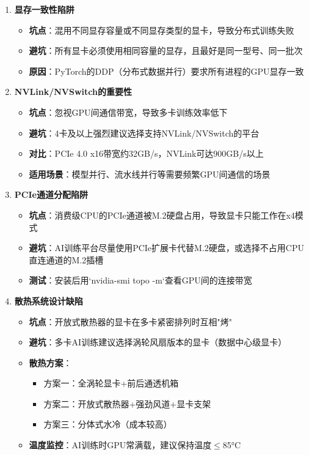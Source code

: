 \documentclass[12pt,UTF8]{ctexbook}
\begin{document}
\begin{enumerate}
    \item \textbf{显存一致性陷阱}
    \begin{itemize}[leftmargin=2em]
        \item \textbf{坑点}：混用不同显存容量或不同显存类型的显卡，导致分布式训练失败
        \item \textbf{避坑}：所有显卡必须使用相同容量的显存，且最好是同一型号、同一批次
        \item \textbf{原因}：PyTorch的DDP（分布式数据并行）要求所有进程的GPU显存一致
    \end{itemize}
    
    \item \textbf{NVLink/NVSwitch的重要性}
    \begin{itemize}[leftmargin=2em]
        \item \textbf{坑点}：忽视GPU间通信带宽，导致多卡训练效率低下
        \item \textbf{避坑}：4卡及以上强烈建议选择支持NVLink/NVSwitch的平台
        \item \textbf{对比}：PCIe 4.0 x16带宽约32GB/s，NVLink可达900GB/s以上
        \item \textbf{适用场景}：模型并行、流水线并行等需要频繁GPU间通信的场景
    \end{itemize}
    
    \item \textbf{PCIe通道分配陷阱}
    \begin{itemize}[leftmargin=2em]
        \item \textbf{坑点}：消费级CPU的PCIe通道被M.2硬盘占用，导致显卡只能工作在x4模式
        \item \textbf{避坑}：AI训练平台尽量使用PCIe扩展卡代替M.2硬盘，或选择不占用CPU直连通道的M.2插槽
        \item \textbf{测试}：安装后用`nvidia-smi topo -m`查看GPU间的连接带宽
    \end{itemize}
    
    \item \textbf{散热系统设计缺陷}
    \begin{itemize}[leftmargin=2em]
        \item \textbf{坑点}：开放式散热器的显卡在多卡紧密排列时互相"烤"
        \item \textbf{避坑}：多卡AI训练建议选择涡轮风扇版本的显卡（数据中心级显卡）
        \item \textbf{散热方案}：
        \begin{itemize}[leftmargin=2em]
            \item 方案一：全涡轮显卡+前后通透机箱
            \item 方案二：开放式散热器+强劲风道+显卡支架
            \item 方案三：分体式水冷（成本较高）
        \end{itemize}
        \item \textbf{温度监控}：AI训练时GPU常满载，建议保持温度$\le$85°C
    \end{itemize}
    

\end{enumerate}
\end{document}
